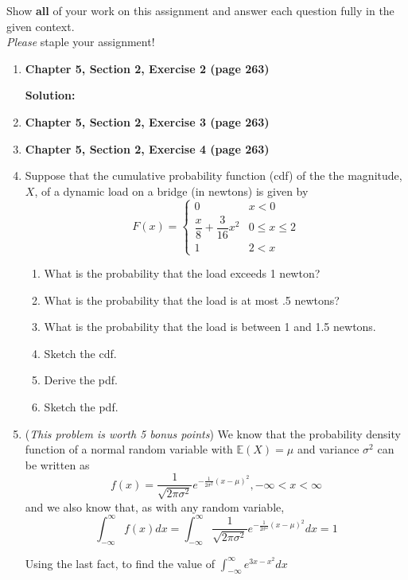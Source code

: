 \documentclass[11pt]{article}
\newcommand{\ben}{\begin{enumerate}}
\newcommand{\een}{\end{enumerate}}
\begin{document}
\pagestyle{fancy} 

Show \textbf{all} of your work on this assignment and answer each question fully in the given context. \\

\emph{Please} staple your assignment! \\

\ben


\item \textbf{Chapter 5, Section 2, Exercise 2 (page 263)}

\textbf{Solution:}


\item \textbf{Chapter 5, Section 2, Exercise 3 (page 263)}

\item \textbf{Chapter 5, Section 2, Exercise 4 (page 263)}

 
\item Suppose that the cumulative probability function (cdf)
of the the magnitude, $X$, of a dynamic load on a bridge (in newtons) is given by
$$
F(x) = \begin{cases}
     0 & x < 0 \\
     \dfrac{x}{8} + \dfrac{3}{16}x^2 & 0 \leq x \leq 2\\
     1 & 2 < x
\end{cases}
$$
\ben
\item What is the probability that the load exceeds 1 newton?

\item What is the probability that the load is at most .5 newtons?

\item What is the probability that the load is between 1 and 1.5 newtons.

\item Sketch the cdf.

\item Derive the pdf.

\item Sketch the pdf.
\een 

 \item (\textit{This problem is worth 5 bonus points})
    We know that the probability density function of a normal random variable with $\mathbb{E}(X) = \mu$ and variance $\sigma^2$ can be written as
    $$
    f(x) = \frac{1}{\sqrt{2 \pi \sigma^2}} e^{-\frac{1}{2 \sigma^2 } (x - \mu)^2}, -\infty < x < \infty
    $$
    and we also know that, as with any random variable, 
    $$
    \int_{-\infty}^{\infty} f(x) dx  = \int_{-\infty}^{\infty} \frac{1}{\sqrt{2 \pi \sigma^2}} e^{-\frac{1}{2 \sigma^2 } (x - \mu)^2} dx  = 1
    $$

    Using the last fact, to find the value of $ \int_{-\infty}^{\infty} e^{3x -x^2} dx $
\een
\end{document}
